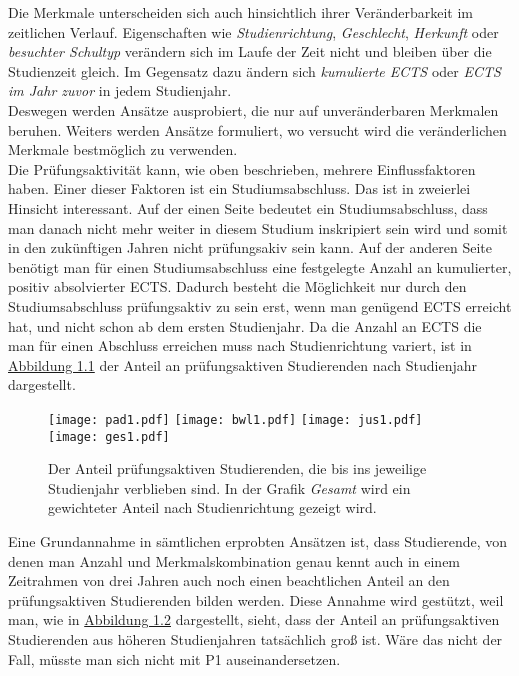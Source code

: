 Die Merkmale unterscheiden sich auch hinsichtlich ihrer Ver\"anderbarkeit im zeitlichen Verlauf. Eigenschaften wie \textit{\glqq Studienrichtung\grqq{}},
\textit{\glqq Geschlecht\grqq{}}, \textit{\glqq Herkunft\grqq{}} oder \textit{\glqq besuchter Schultyp\grqq{}} ver\"andern sich im Laufe der Zeit nicht und bleiben \"uber die Studienzeit gleich. 
Im Gegensatz dazu \"andern sich \textit{\glqq kumulierte ECTS\grqq{}} oder \textit{\glqq ECTS im Jahr zuvor\grqq{}} in jedem Studienjahr. \\

Deswegen werden Ans\"atze ausprobiert, die nur auf unver\"anderbaren Merkmalen beruhen. Weiters werden Ans\"atze formuliert, wo versucht wird
die ver\"anderlichen Merkmale bestm\"oglich zu verwenden. \\

Die Pr\"ufungsaktivit\"at kann, wie oben beschrieben, mehrere Einflussfaktoren haben. Einer dieser Faktoren ist ein Studiumsabschluss. Das ist in zweierlei Hinsicht interessant.
Auf der einen Seite bedeutet ein Studiumsabschluss, dass man danach nicht mehr weiter in diesem Studium inskripiert sein wird und somit in den zuk\"unftigen Jahren nicht 
pr\"ufungsakiv sein kann. Auf der anderen Seite ben\"otigt man f\"ur einen Studiumsabschluss eine festgelegte Anzahl an kumulierter, positiv absolvierter ECTS. Dadurch besteht die 
M\"oglichkeit nur durch den Studiumsabschluss pr\"ufungsaktiv zu sein erst, wenn man gen\"ugend ECTS erreicht hat, und nicht schon ab dem ersten Studienjahr. 
Da die Anzahl an ECTS die man f\"ur einen Abschluss erreichen muss nach Studienrichtung variert, ist in \hyperref[fig:abb1]{Abbildung 1.1} 
der Anteil an pr\"ufungsaktiven Studierenden nach Studienjahr dargestellt. 

\begin{figure}[ht]
  \label{fig:abb1}
  \texttt{[image: pad1.pdf]}
  \texttt{[image: bwl1.pdf]}
  \texttt{[image: jus1.pdf]}
  \texttt{[image: ges1.pdf]}
  \caption[Anteil an pr\"ufungsaktiven Studierenden nach Studienjahr und -richtung]{Der Anteil pr\"ufungsaktiven Studierenden, die bis ins jeweilige 
  Studienjahr verblieben sind. In der Grafik \textit{Gesamt} wird ein gewichteter
  Anteil nach Studienrichtung gezeigt wird.}
\end{figure}

Eine Grundannahme in s\"amtlichen erprobten Ans\"atzen ist, dass Studierende, von denen man Anzahl und Merkmalskombination genau kennt auch in einem Zeitrahmen von 
drei Jahren auch noch einen beachtlichen Anteil an den pr\"ufungsaktiven Studierenden bilden werden. Diese Annahme wird gest\"utzt, weil man, wie in \hyperref[fig:abb2]{Abbildung 1.2}
dargestellt, sieht, dass der Anteil an pr\"ufungsaktiven Studierenden aus h\"oheren Studienjahren tats\"achlich gro{\ss} ist. W\"are das nicht der Fall, m\"usste man sich nicht mit 
P1 auseinandersetzen. 

